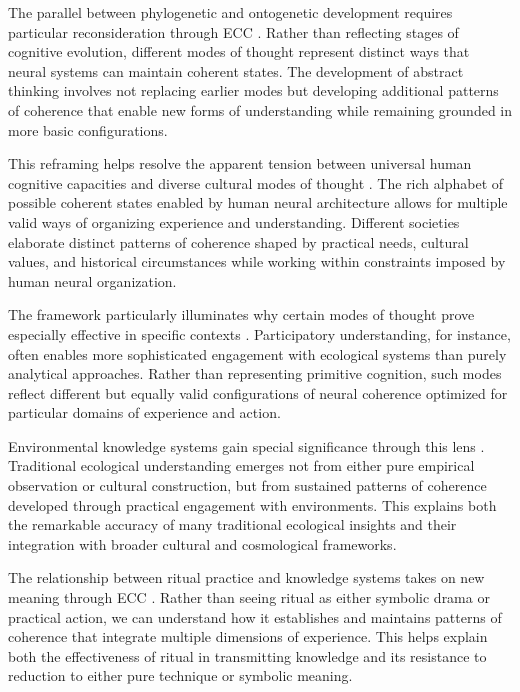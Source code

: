 \begin{refsection}
The parallel between phylogenetic and ontogenetic development requires particular reconsideration through ECC \cite{piaget1971structuralism}. Rather than reflecting stages of cognitive evolution, different modes of thought represent distinct ways that neural systems can maintain coherent states. The development of abstract thinking involves not replacing earlier modes but developing additional patterns of coherence that enable new forms of understanding while remaining grounded in more basic configurations.

This reframing helps resolve the apparent tension between universal human cognitive capacities and diverse cultural modes of thought \cite{sperber1996explaining}. The rich alphabet of possible coherent states enabled by human neural architecture allows for multiple valid ways of organizing experience and understanding. Different societies elaborate distinct patterns of coherence shaped by practical needs, cultural values, and historical circumstances while working within constraints imposed by human neural organization.

The framework particularly illuminates why certain modes of thought prove especially effective in specific contexts \cite{rappaport1984pigs}. Participatory understanding, for instance, often enables more sophisticated engagement with ecological systems than purely analytical approaches. Rather than representing primitive cognition, such modes reflect different but equally valid configurations of neural coherence optimized for particular domains of experience and action.

Environmental knowledge systems gain special significance through this lens \cite{bateson1979mind}. Traditional ecological understanding emerges not from either pure empirical observation or cultural construction, but from sustained patterns of coherence developed through practical engagement with environments. This explains both the remarkable accuracy of many traditional ecological insights and their integration with broader cultural and cosmological frameworks.

The relationship between ritual practice and knowledge systems takes on new meaning through ECC \cite{turner1982ritual}. Rather than seeing ritual as either symbolic drama or practical action, we can understand how it establishes and maintains patterns of coherence that integrate multiple dimensions of experience. This helps explain both the effectiveness of ritual in transmitting knowledge and its resistance to reduction to either pure technique or symbolic meaning.


\end{refsection}
